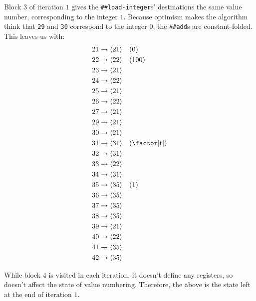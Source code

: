Block $3$ of iteration $1$ gives the \Verb|##load-integer|s' destinations the
same value number, corresponding to the integer $1$.  Because optimism makes
the algorithm think that \Verb|29| and \Verb|30| correspond to the integer
$0$, the \Verb|##add|s are constant-folded.  This leaves us with:
%
\begin{align*}
  21 &\to \vn{21} \quad (0)                 \\
  22 &\to \vn{22} \quad (100)               \\
  23 &\to \vn{21}                           \\
  24 &\to \vn{22}                           \\
  25 &\to \vn{21}                           \\
  26 &\to \vn{22}                           \\
  27 &\to \vn{21}                           \\
  29 &\to \vn{21}                           \\
  30 &\to \vn{21}                           \\
  31 &\to \vn{31} \quad (\text{\factor|t|}) \\
  32 &\to \vn{31}                           \\
  33 &\to \vn{22}                           \\
  34 &\to \vn{31}                           \\
  35 &\to \vn{35} \quad (1)                 \\
  36 &\to \vn{35}                           \\
  37 &\to \vn{35}                           \\
  38 &\to \vn{35}                           \\
  39 &\to \vn{21}                           \\
  40 &\to \vn{22}                           \\
  41 &\to \vn{35}                           \\
  42 &\to \vn{35}
\end{align*}

While block $4$ is visited in each iteration, it doesn't define any registers,
so doesn't affect the state of value numbering.  Therefore, the above is the
state left at the end of iteration $1$.

